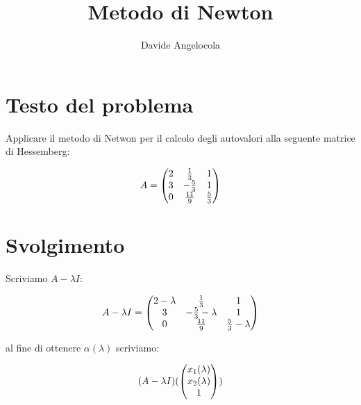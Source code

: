\documentclass{article}
\title{Metodo di Newton}
\author{Davide Angelocola}
\begin{document}
\maketitle

\section{Testo del problema}

Applicare il metodo di Netwon per il calcolo degli autovalori alla seguente matrice di Hessemberg:

$$
A = \begin{pmatrix}
2 & \frac{1}{3} & 1 \cr 
3 & -\frac{5}{3} & 1 \cr 
0 & \frac{11}{9} & \frac{5}{3} \cr 
\end{pmatrix}
$$

\section{Svolgimento}

Scriviamo $A - \lambda I$:

$$
A - \lambda I = \begin{pmatrix}
2 - \lambda & \frac{1}{3} & 1 \cr 
3 & -\frac{5}{3}  - \lambda & 1 \cr 
0 & \frac{11}{9} & \frac{5}{3}  - \lambda \cr 
\end{pmatrix}
$$

al fine di ottenere $ \alpha( \lambda ) $ scriviamo:

$$
(A - \lambda I) (
\begin{pmatrix} 
x_1(\lambda ) \cr 
x_2(\lambda ) \cr 
1 \cr 
\end{pmatrix})

$$
\end{document}
